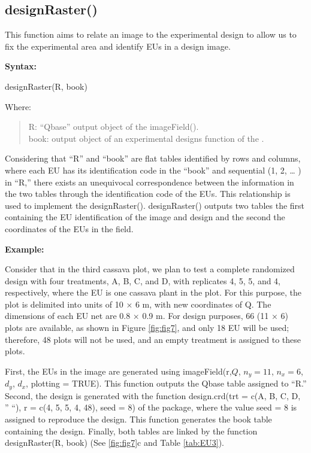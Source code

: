 \subsection{designRaster()}\label{designraster}

This function aims to relate an image to the experimental design to allow us to fix the experimental area and identify EUs in a design image.

\textbf{Syntax:}

designRaster(R, book)

Where:

\begin{quote}
R: ``Qbase'' output object of the imageField().\\
book: output object of an experimental designs function of the .
\end{quote}

Considering that ``R'' and ``book'' are flat tables identified by rows and columns, where each EU has its identification code in the ``book'' and sequential (1, 2, \ldots{} ) in ``R,'' there exists an unequivocal correspondence between the information in the two tables through the identification code of the EUs. This relationship is used to implement the designRaster(). designRaster() outputs two tables the first containing the EU identification of the image and design and the second the coordinates of the EUs in the field.

\textbf{Example:}

Consider that in the third cassava plot, we plan to test a complete randomized design with four treatments, A, B, C, and D, with replicates 4, 5, 5, and 4, respectively, where the EU is one cassava plant in the plot. For this purpose, the plot is delimited into units of 10 × 6 m, with new coordinates of Q. The dimensions of each EU net are 0.8 × 0.9 m. For design purposes, 66 (11 × 6) plots are available, as shown in Figure \ref{fig:fig7}, and only 18 EU will be used; therefore, 48 plots will not be used, and an empty treatment is assigned to these plots.

First, the EUs in the image are generated using imageField(r,\(Q\), \(n_y = 11\), \(n_x = 6\), \(d_y\), \(d_x\), plotting = TRUE). This function outputs the Qbase table assigned to ``R.'' Second, the design is generated with the function design.crd(trt = c(A, B, C, D, '' ``), r = c(4, 5, 5, 4, 48), seed = 8) of the  package, where the value seed = 8 is assigned to reproduce the design. This function generates the book table containing the design. Finally, both tables are linked by the function designRaster(R, book) (See \ref{fig:fig7}c and Table \ref{tab:EU3}).

